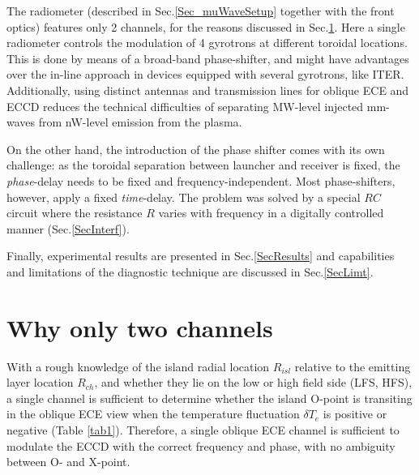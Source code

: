 \documentclass[aps,pra,twocolumn]{revtex4}
\begin{document}
The radiometer (described in Sec.\ref{Sec_muWaveSetup} together with the 
front optics) features only 2 channels, for the reasons discussed in 
Sec.\ref{SecPrincip}. 
Here a single radiometer controls the modulation of 4 gyrotrons 
at different toroidal locations. This is done by means of a broad-band 
phase-shifter, and might have advantages over the in-line approach 
\cite{Ooster} in devices equipped with several gyrotrons, like ITER. 
Additionally, using distinct antennas and transmission lines for 
oblique ECE and ECCD reduces the technical difficulties of separating 
MW-level injected mm-waves from nW-level emission from the plasma. 
 
On the other hand, the introduction of the phase shifter comes with its own 
challenge: as the toroidal separation between launcher and receiver is fixed, 
the {\em phase}-delay needs to be fixed and frequency-independent. 
Most phase-shifters, however, apply a fixed {\em time}-delay. 
The problem was solved by a special $RC$ circuit 
where the resistance $R$ varies with frequency in a digitally controlled 
manner (Sec.\ref{SecInterf}). 

Finally, experimental results are presented in Sec.\ref{SecResults} and 
capabilities and limitations of the 
diagnostic technique are discussed in Sec.\ref{SecLimt}. 



\section{Why only two channels}   \label{SecPrincip}
With a rough knowledge of the island radial location $R_{isl}$
relative to the emitting layer location $R_{ch}$, and whether they lie
on the low  or high field side (LFS, HFS), a single channel is 
sufficient to determine whether the island O-point is transiting in the 
oblique ECE view when the temperature fluctuation $\delta T_e$ is positive or 
negative (Table \ref{tab1}). 
Therefore, a single oblique ECE channel is sufficient to modulate the ECCD 
with the correct frequency and phase, with no ambiguity between O- and 
X-point. 

%
\end{document}
